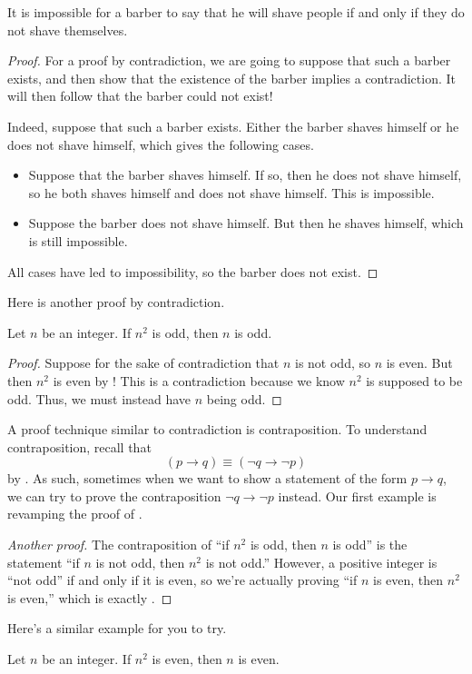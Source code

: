\documentclass[../notes.tex]{subfiles}
\begin{document}
\begin{example} \label{exe:barber-diagonalization} %
    It is impossible for a barber to say that he will shave people if and only if they do not shave themselves.
\end{example}
\begin{proof}
    For a proof by contradiction, we are going to suppose that such a barber exists, and then show that the existence of the barber implies a contradiction. It will then follow that the barber could not exist!
    
    Indeed, suppose that such a barber exists. Either the barber shaves himself or he does not shave himself, which gives the following cases.
    \begin{itemize}
        \item Suppose that the barber shaves himself. If so, then he does not shave himself, so he both shaves himself and does not shave himself. This is impossible.
        \item Suppose the barber does not shave himself. But then he shaves himself, which is still impossible.
    \end{itemize}
    All cases have led to impossibility, so the barber does not exist.
\end{proof}
Here is another proof by contradiction.
\begin{example} \label{exe:odd-square-to-odd}
    Let $n$ be an integer. If $n^2$ is odd, then $n$ is odd.
\end{example}
\begin{proof}
    Suppose for the sake of contradiction that $n$ is not odd, so $n$ is even. But then $n^2$ is even by ! This is a contradiction because we know $n^2$ is supposed to be odd. Thus, we must instead have $n$ being odd.
\end{proof}
A proof technique similar to contradiction is contraposition. To understand contraposition, recall that
\[(p\to q)\equiv(\lnot q\to\lnot p)\]
by . As such, sometimes when we want to show a statement of the form $p\to q$, we can try to prove the contraposition $\lnot q\to\lnot p$ instead. Our first example is revamping the proof of .
\begin{proof}[Another proof]
    The contraposition of ``if $n^2$ is odd, then $n$ is odd'' is the statement ``if $n$ is not odd, then $n^2$ is not odd.'' However, a positive integer is ``not odd'' if and only if it is even, so we're actually proving ``if $n$ is even, then $n^2$ is even,'' which is exactly .
\end{proof}
Here's a similar example for you to try.
\begin{exe}
    Let $n$ be an integer. If $n^2$ is even, then $n$ is even.
\end{exe}
\end{document}
